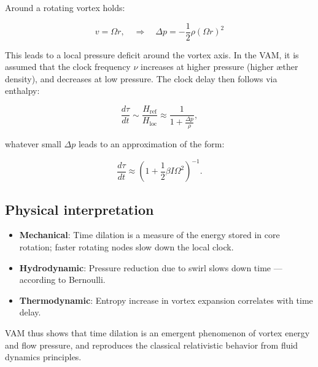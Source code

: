 Around a rotating vortex holds:

\[
    v = \Omega r, \quad \Rightarrow \quad \Delta p = -\frac{1}{2} \rho (\Omega r)^2
\]

This leads to a local pressure deficit around the vortex axis. In the VAM, it is assumed that the clock frequency $\nu$ increases at higher pressure (higher æther density), and decreases at low pressure. The clock delay then follows via enthalpy:

\begin{equation}
    \frac{d\tau}{dt} \sim \frac{H_\text{ref}}{H_\text{loc}} \approx \frac{1}{1 + \frac{\Delta p}{\rho}},
\end{equation}

whatever small $\Delta p$ leads to an approximation of the form:

\begin{equation}
    \frac{d\tau}{dt} \approx \left(1 + \frac{1}{2} \beta I \Omega^2 \right)^{-1}.
\end{equation}

\subsection{Physical interpretation}

\begin{itemize}
    \item \textbf{Mechanical}: Time dilation is a measure of the energy stored in core rotation; faster rotating nodes slow down the local clock.
    \item \textbf{Hydrodynamic}: Pressure reduction due to swirl slows down time — according to Bernoulli.
    \item \textbf{Thermodynamic}: Entropy increase in vortex expansion correlates with time delay.
\end{itemize}

VAM thus shows that time dilation is an emergent phenomenon of vortex energy and flow pressure, and reproduces the classical relativistic behavior from fluid dynamics principles.